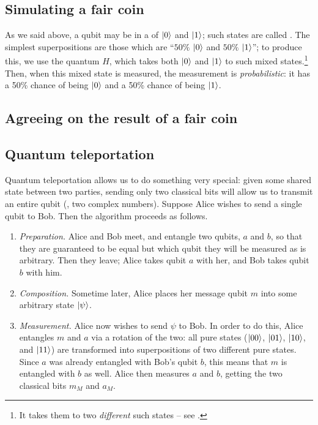 \documentclass[12pt]{amsart}
\begin{document}
{\subsection{Simulating a fair coin}\label{sec:fair-coin-hl}
As we said above, a qubit may be in a  of ${\left\vert{0}\right\rangle}$ and
${\left\vert{1}\right\rangle}$; such states are called .  The simplest
superpositions are those which are ``$50\%$ ${\left\vert{0}\right\rangle}$ and $50\%$ ${\left\vert{1}\right\rangle}$''; to
produce this, we use the quantum  $H$, which takes both
${\left\vert{0}\right\rangle}$ and ${\left\vert{1}\right\rangle}$ to such mixed states.\footnote{It takes them to two
\emph{different} such states -- see .}  Then, when this
mixed state is measured, the measurement is \emph{probabilistic}: it has a 50\%
chance of being ${\left\vert{0}\right\rangle}$ and a 50\% chance of being ${\left\vert{1}\right\rangle}$.


\subsection{Agreeing on the result of a fair coin}\label{sec:agree-coin-hl}

\subsection{Quantum teleportation}\label{sec:teleportation-hl}
Quantum teleportation allows us to do something very special: given some shared
state between two parties, sending only two classical bits will allow us to
transmit an entire qubit (\IE, two complex numbers).  Suppose Alice wishes to
send a single qubit to Bob.  Then the algorithm proceeds as follows.

\begin{enumerate}
  \item \emph{Preparation.} Alice and Bob meet, and entangle two qubits, $a$ and
    $b$, so that they are guaranteed to be equal but which qubit they will be
    measured as is arbitrary.  Then they leave; Alice takes qubit $a$ with her,
    and Bob takes qubit $b$ with him.

  \item \emph{Composition.}  Sometime later, Alice places her message qubit $m$
    into some arbitrary state ${\left\vert{\psi}\right\rangle}$.

  \item \emph{Measurement.}  Alice now wishes to send $\psi$ to Bob.  In order
    to do this, Alice entangles $m$ and $a$ via a rotation of the two: all pure states (${\left\vert{00}\right\rangle}$, ${\left\vert{01}\right\rangle}$,
    ${\left\vert{10}\right\rangle}$, and ${\left\vert{11}\right\rangle}$) are transformed into superpositions of two
    different pure states.  Since $a$ was already entangled with Bob's qubit
    $b$, this means that $m$ is entangled with $b$ as well.  Alice then measures $a$ and $b$,
    getting the two classical bits $m_M$ and $a_M$.


\end{enumerate}}
\end{document}
